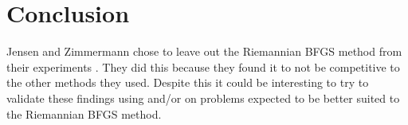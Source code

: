 \section{Conclusion}

Jensen and Zimmermann chose to leave out the Riemannian BFGS method from their experiments \cite[p.~11]{JensenZimmermann2024}. They did this because they found it to not be competitive to the other methods they used. Despite this it could be interesting to try to validate these findings using  and/or on problems expected to be better suited to the Riemannian BFGS method.

